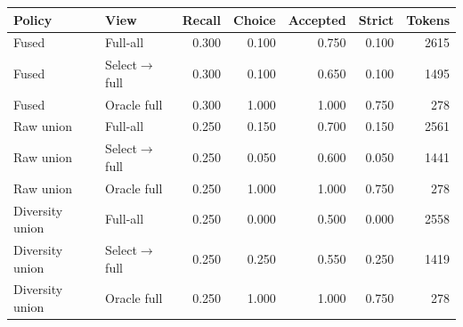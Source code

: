 \begin{tabular}{llrrrrr}
\toprule
Policy & View & Recall & Choice & Accepted & Strict & Tokens \\
\midrule
Fused & Full-all & 0.300 & 0.100 & 0.750 & 0.100 & 2615 \\
Fused & Select$\to$full & 0.300 & 0.100 & 0.650 & 0.100 & 1495 \\
Fused & Oracle full & 0.300 & 1.000 & 1.000 & 0.750 & 278 \\
Raw union & Full-all & 0.250 & 0.150 & 0.700 & 0.150 & 2561 \\
Raw union & Select$\to$full & 0.250 & 0.050 & 0.600 & 0.050 & 1441 \\
Raw union & Oracle full & 0.250 & 1.000 & 1.000 & 0.750 & 278 \\
Diversity union & Full-all & 0.250 & 0.000 & 0.500 & 0.000 & 2558 \\
Diversity union & Select$\to$full & 0.250 & 0.250 & 0.550 & 0.250 & 1419 \\
Diversity union & Oracle full & 0.250 & 1.000 & 1.000 & 0.750 & 278 \\
\bottomrule
\end{tabular}
